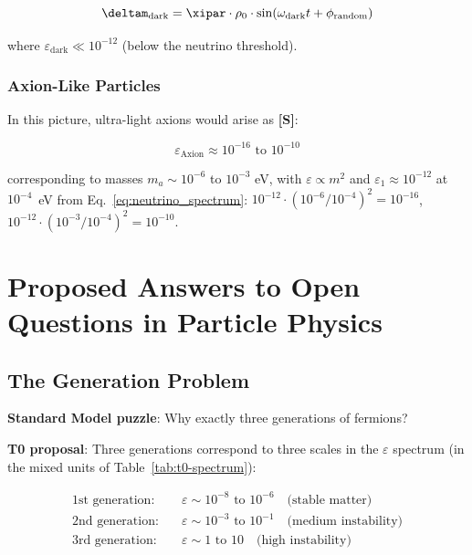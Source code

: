 	\begin{equation}
		\deltam_{\text{dark}} = \xipar \cdot \rho_0 \cdot \sin(\omega_{\text{dark}} t + \phi_{\text{random}})
		\label{eq:dark_matter_field}
	\end{equation}
	
	where $\varepsilon_{\text{dark}} \ll 10^{-12}$ (below the neutrino threshold).
	
	\subsubsection{Axion-Like Particles}
	
	In this picture, ultra-light axions would arise as \textbf{[S]}:
	
	\begin{equation}
		\varepsilon_{\text{Axion}} \approx 10^{-16} \text{ to } 10^{-10}
		\label{eq:axion_epsilon}
	\end{equation}
	
	corresponding to masses $m_a \sim 10^{-6}$ to $10^{-3}$ eV, with $\varepsilon \propto m^2$ and $\varepsilon_1 \approx 10^{-12}$ at $10^{-4}$~eV from Eq.~\eqref{eq:neutrino_spectrum}: $10^{-12}\cdot(10^{-6}/10^{-4})^2 = 10^{-16}$, $10^{-12}\cdot(10^{-3}/10^{-4})^2 = 10^{-10}$.
	
	\section{Proposed Answers to Open Questions in Particle Physics}
	
	\subsection{The Generation Problem}
	
	\textbf{Standard Model puzzle}: Why exactly three generations of fermions?
	
	\textbf{T0 proposal}: Three generations correspond to three scales in the $\varepsilon$ spectrum (in the mixed units of Table~\ref{tab:t0-spectrum}):
	
	\begin{align}
		\text{1st generation}: \quad &\varepsilon \sim 10^{-8} \text{ to } 10^{-6} \quad \text{(stable matter)} \\
		\text{2nd generation}: \quad &\varepsilon \sim 10^{-3} \text{ to } 10^{-1} \quad \text{(medium instability)} \\
		\text{3rd generation}: \quad &\varepsilon \sim 1 \text{ to } 10 \quad \text{(high instability)}
	\end{align}
	
